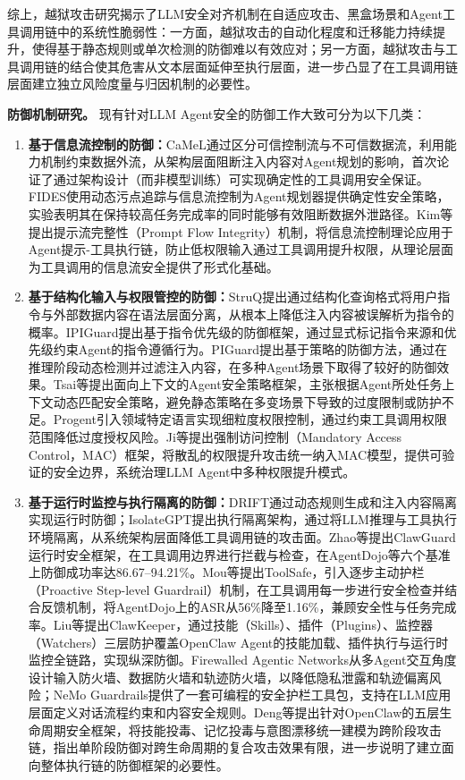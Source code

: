 综上，越狱攻击研究揭示了LLM安全对齐机制在自适应攻击、黑盒场景和Agent工具调用链中的系统性脆弱性：一方面，越狱攻击的自动化程度和迁移能力持续提升，使得基于静态规则或单次检测的防御难以有效应对；另一方面，越狱攻击与工具调用链的结合使其危害从文本层面延伸至执行层面，进一步凸显了在工具调用链层面建立独立风险度量与归因机制的必要性。

\textbf{防御机制研究。}
现有针对LLM Agent安全的防御工作大致可分为以下几类：
\begin{enumerate}
  \item \textbf{基于信息流控制的防御：}CaMeL\cite{debenedetti2025camel}通过区分可信控制流与不可信数据流，利用能力机制约束数据外流，从架构层面阻断注入内容对Agent规划的影响，首次论证了通过架构设计（而非模型训练）可实现确定性的工具调用安全保证。FIDES\cite{costa2025fides}使用动态污点追踪与信息流控制为Agent规划器提供确定性安全策略，实验表明其在保持较高任务完成率的同时能够有效阻断数据外泄路径。Kim等\cite{kim2025promptflow}提出提示流完整性（Prompt Flow Integrity）机制，将信息流控制理论应用于Agent提示-工具执行链，防止低权限输入通过工具调用提升权限，从理论层面为工具调用的信息流安全提供了形式化基础。
  \item \textbf{基于结构化输入与权限管控的防御：}StruQ\cite{chen2025struq}提出通过结构化查询格式将用户指令与外部数据内容在语法层面分离，从根本上降低注入内容被误解析为指令的概率。IPIGuard\cite{an2025ipiguard}提出基于指令优先级的防御框架，通过显式标记指令来源和优先级约束Agent的指令遵循行为。PIGuard\cite{li2025piguard}提出基于策略的防御方法，通过在推理阶段动态检测并过滤注入内容，在多种Agent场景下取得了较好的防御效果。Tsai等\cite{tsai2025contextual}提出面向上下文的Agent安全策略框架，主张根据Agent所处任务上下文动态匹配安全策略，避免静态策略在多变场景下导致的过度限制或防护不足。Progent\cite{shi2025progent}引入领域特定语言实现细粒度权限控制，通过约束工具调用权限范围降低过度授权风险。Ji等\cite{ji2026mac}提出强制访问控制（Mandatory Access Control，MAC）框架，将散乱的权限提升攻击统一纳入MAC模型，提供可验证的安全边界，系统治理LLM Agent中多种权限提升模式。
  \item \textbf{基于运行时监控与执行隔离的防御：}DRIFT\cite{li2025drift}通过动态规则生成和注入内容隔离实现运行时防御；IsolateGPT\cite{wu2025isolategpt}提出执行隔离架构，通过将LLM推理与工具执行环境隔离，从系统架构层面降低工具调用链的攻击面。Zhao等\cite{zhao2026clawguard}提出ClawGuard运行时安全框架，在工具调用边界进行拦截与检查，在AgentDojo等六个基准上防御成功率达86.67--94.21\%。Mou等\cite{mou2026toolsafe}提出ToolSafe，引入逐步主动护栏（Proactive Step-level Guardrail）机制，在工具调用每一步进行安全检查并结合反馈机制，将AgentDojo上的ASR从56\%降至1.16\%，兼顾安全性与任务完成率。Liu等\cite{liu2026clawkeeper}提出ClawKeeper，通过技能（Skills）、插件（Plugins）、监控器（Watchers）三层防护覆盖OpenClaw Agent的技能加载、插件执行与运行时监控全链路，实现纵深防御。Firewalled Agentic Networks\cite{abdelnabi2025firewalls}从多Agent交互角度设计输入防火墙、数据防火墙和轨迹防火墙，以降低隐私泄露和轨迹偏离风险；NeMo Guardrails\cite{rebedea2023nemo}提供了一套可编程的安全护栏工具包，支持在LLM应用层面定义对话流程约束和内容安全规则。Deng等\cite{deng2026tamingopenclaw}提出针对OpenClaw的五层生命周期安全框架，将技能投毒、记忆投毒与意图漂移统一建模为跨阶段攻击链，指出单阶段防御对跨生命周期的复合攻击效果有限，进一步说明了建立面向整体执行链的防御框架的必要性。

\end{enumerate}

